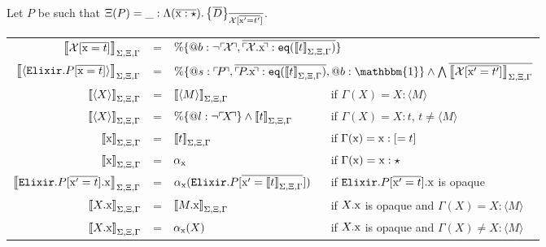 \documentclass[12pt]{article}
\newcommand{\tx}{\text{\rm x}}
\newcommand{\BX}{\ensuremath{\mathcal{X}}}
\newcommand{\Gammatop}{\ensuremath{\Xi}}
\newcommand{\Gammabot}{\ensuremath{\Gamma}}
\newcommand{\toptype}{\mathbbm{1}}
\newcommand{\Elixir}{\texttt{Elixir}}
\newcommand{\eq}{\texttt{eq}}
\begin{document}
Let $P$ be such that $\Gammatop(P) = \_ : \Moddecl[\tx][\overline{D}][\BX][\tx'][t']$.
\begin{center}
    \begin{tabular}{rcll}
        $ \interp{\BX[\overline{\tx = t}]} $                     & = & \multicolumn{2}{l}{$\%\{ @b: \lnot \ulcorner\! \BX \!\urcorner, \overline{\ulcorner\!\BX.\tx\!\urcorner : \eq(\interp{t})}  \}$}                                                                      \\[2mm]
        $\interp{\langle \Elixir.P[\overline{\tx = t}] \rangle}$ & = &
        \multicolumn{2}{l}{$\%\{ @s: \ulcorner\! P \!\urcorner, \overline{\ulcorner\!P.\tx\!\urcorner : \eq(\interp{t})}, @b : \toptype \} \wedge \bigwedge \overline{\interp{\BX[\overline{\tx' = t'}]}}$}                                                                  \\[2mm]
        $\interp{\langle X \rangle} $                            & = & $\interp{\langle M \rangle}$                                                                                                     & if $\Gammabot(X) = X : \langle M \rangle$                          \\[1.5mm]
        $\interp{\langle X \rangle} $                            & = & $\% \{ @l: \lnot \ulcorner\! X \!\urcorner \} \wedge \interp{t}$                                                                 & if $\Gammabot(X) = X : t$, $t \neq \langle M \rangle$              \\[3mm]
        $ \interp{\tx} $                                         & = & $\interp{t}$                                                                                                                     & if $\Gammabot(\tx) = \tx : [= t]$                                  \\
        $ \interp{\tx} $                                         & = & $\alpha_\tx$                                                                                                                     & if $\Gammabot(\tx) = \tx : \star$                                  \\
        $ \interp{\Elixir.P[\overline{\tx' = t}].\tx} $          & = & $\alpha_\tx(\Elixir.P[\overline{\tx' = \interp{t}}]) $                                                                           & if $\Elixir.P[\overline{\tx' = t}].\tx$ is opaque                  \\
        $ \interp{X.\tx} $                                       & = & $\interp{M.\tx} $                                                                                                                & if $X.\tx$ is opaque and $\Gammabot(X) = X : \langle M \rangle$    \\
        $ \interp{X.\tx} $                                       & = & $\alpha_\tx(X)  $                                                                                                                & if $X.\tx$ is opaque and $\Gammabot(X) \neq X : \langle M \rangle$
    \end{tabular}
\end{center}
\end{document}
